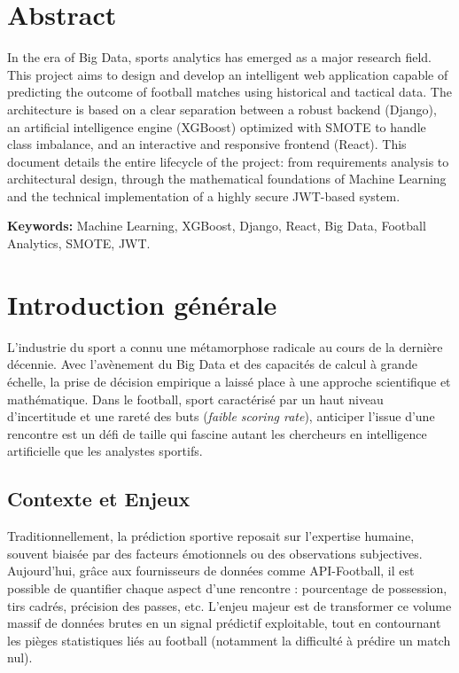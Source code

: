 \documentclass[12pt,a4paper,oneside]{book}
\begin{document}
\chapter*{Abstract}
In the era of Big Data, sports analytics has emerged as a major research field. This project aims to design and develop an intelligent web application capable of predicting the outcome of football matches using historical and tactical data. The architecture is based on a clear separation between a robust backend (Django), an artificial intelligence engine (XGBoost) optimized with SMOTE to handle class imbalance, and an interactive and responsive frontend (React). This document details the entire lifecycle of the project: from requirements analysis to architectural design, through the mathematical foundations of Machine Learning and the technical implementation of a highly secure JWT-based system.

\vspace{1cm}
\noindent\textbf{Keywords:} Machine Learning, XGBoost, Django, React, Big Data, Football Analytics, SMOTE, JWT.

\tableofcontents
\listoffigures
\listoftables

\mainmatter

\chapter*{Introduction générale}

L'industrie du sport a connu une métamorphose radicale au cours de la dernière décennie. Avec l'avènement du Big Data et des capacités de calcul à grande échelle, la prise de décision empirique a laissé place à une approche scientifique et mathématique. Dans le football, sport caractérisé par un haut niveau d'incertitude et une rareté des buts (\textit{faible scoring rate}), anticiper l'issue d'une rencontre est un défi de taille qui fascine autant les chercheurs en intelligence artificielle que les analystes sportifs.

\section*{Contexte et Enjeux}
Traditionnellement, la prédiction sportive reposait sur l'expertise humaine, souvent biaisée par des facteurs émotionnels ou des observations subjectives. Aujourd'hui, grâce aux fournisseurs de données comme API-Football, il est possible de quantifier chaque aspect d'une rencontre : pourcentage de possession, tirs cadrés, précision des passes, etc. L'enjeu majeur est de transformer ce volume massif de données brutes en un signal prédictif exploitable, tout en contournant les pièges statistiques liés au football (notamment la difficulté à prédire un match nul).
\end{document}
